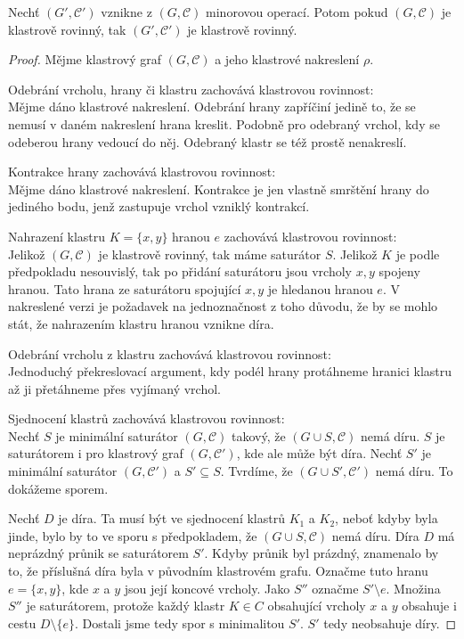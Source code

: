 \begin{tvr} Nechť $(G', \mathcal C')$ vznikne z $(G, \mathcal C)$ minorovou operací. Potom pokud $(G, \mathcal C)$ je klastrově rovinný, tak $(G', \mathcal C')$ je klastrově rovinný.
\label{min_op_zach_kl_rov}
\end{tvr}
\begin{proof}

Mějme klastrový graf $(G, \mathcal C)$ a jeho klastrové nakreslení $\rho$.

Odebrání vrcholu, hrany či klastru zachovává klastrovou rovinnost:\\
Mějme dáno klastrové nakreslení. Odebrání hrany zapříčiní jedině to, že se nemusí v daném nakreslení hrana kreslit. Podobně pro odebraný vrchol, kdy se odeberou hrany vedoucí do něj. Odebraný klastr se též prostě nenakreslí.

Kontrakce hrany zachovává klastrovou rovinnost:\\
Mějme dáno klastrové nakreslení. Kontrakce je jen vlastně smrštění hrany do jediného bodu, jenž zastupuje vrchol vzniklý kontrakcí.

Nahrazení klastru $K=\{x,y\}$ hranou $e$ zachovává klastrovou rovinnost:\\
Jelikož $(G, \mathcal C)$ je klastrově rovinný, tak máme saturátor $S$. Jelikož $K$ je podle předpokladu nesouvislý, tak po přidání saturátoru jsou vrcholy $x, y$ spojeny hranou. Tato hrana ze saturátoru spojující $x,y$ je hledanou hranou $e$. V nakreslené verzi je požadavek na jednoznačnost z toho důvodu, že by se mohlo stát, že nahrazením klastru hranou vznikne díra.  

Odebrání vrcholu z klastru zachovává klastrovou rovinnost:\\
Jednoduchý překreslovací argument, kdy podél hrany protáhneme hranici klastru až ji přetáhneme přes vyjímaný vrchol.

Sjednocení klastrů zachovává klastrovou rovinnost:\\
Nechť $S$ je minimální saturátor $(G,\mathcal C)$ takový, že $(G \cup S,\mathcal C)$ nemá díru. $S$ je saturátorem i pro klastrový graf $(G, \mathcal C')$, kde ale může být díra.
Nechť $S'$ je minimální saturátor $(G, \mathcal C')$ a $S' \subseteq S$. Tvrdíme, že $(G \cup S',\mathcal C')$ nemá díru. To dokážeme sporem.

Nechť $D$ je díra. Ta musí být ve sjednocení klastrů $K_1$ a $K_2$, neboť kdyby byla jinde, bylo by to ve sporu s předpokladem, že $(G \cup S, \mathcal C)$ nemá díru.
Díra $D$ má neprázdný průnik se saturátorem $S'$. Kdyby průnik byl prázdný, znamenalo by to, že příslušná díra byla v původním klastrovém grafu. Označme tuto hranu $e = \{x,y\}$, kde $x$ a $y$ jsou její koncové vrcholy.
Jako $S''$ označme $S' \setminus e$. Množina $S''$ je saturátorem, protože každý klastr $K \in C$ obsahující vrcholy  $x$ a $y$ obsahuje i cestu $D \setminus \{e\}$. Dostali jsme tedy spor s minimalitou $S'$. $S'$ tedy neobsahuje díry.
\end{proof}

